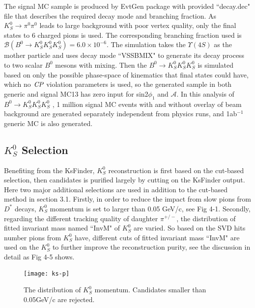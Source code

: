 The signal MC sample is produced by EvtGen package with provided ``decay.dec" file that describes the required decay mode and branching fraction. As $K_S^0 \to \pi^0 \pi^0$ leads to large background with poor vertex quality, only the final states to 6 charged pions is used. The corresponding branching fraction used is $\mathcal{B}(B^0 \to K_S^0  K_S^0  K_S^0) = 6.0 \times 10^{-6}$. The simulation takes the $\Upsilon(4S)$ as the mother particle and uses decay mode ``VSSBMIX" to generate its decay process to two scalar $B^0$ mesons with mixing. Then the $B^0 \to K_S^0  K_S^0  K_S^0$ is simulated based on only the possible phase-space of kinematics that final states could have, which no $\it{CP}$ violation parameters is used, so the generated sample in both generic and signal MC13 has zero input for sin2$\phi_1$ and $\mathcal{A}$.
In this analysis of $B^0 \to K_S^0  K_S^0  K_S^0$ , 1 million signal MC events with and without overlay of beam background are generated separately independent from physics runs, and 1ab$^{-1}$ generic MC is also generated. 

\subsection{$K_S^0$ Selection}
Benefiting from the KsFinder, $K_S^0$ reconstruction is first based on the cut-based selection, then candidates is purified largely by cutting on the KsFinder output. Here two major additional selections are used in addition to the cut-based method in section 3.1. Firstly, in order to reduce the impact from slow pions from $D^{*}$ decays, $K_S^0$ momentum is set to larger than 0.05 GeV/c, see Fig 4-1. Secondly, regarding the different tracking quality of daughter $\pi^{+/-}$, the distribution of fitted invariant mass named ``InvM" of $K_S^0$ are varied. So based on the SVD hits number pions from $K_S^0$ have, different cuts of fitted invariant mass ``InvM" are used on the $K_S^0$ to further improve the reconstruction purity, see the discussion in detail as Fig 4-5 shows.

\begin{figure}[H]
	\centering
	\texttt{[image: ks-p]}
	\caption{The distribution of $K_S^0$ momentum. Candidates smaller than 0.05GeV/c are rejected.}
	\label{fig:ks-p}
\end{figure}

